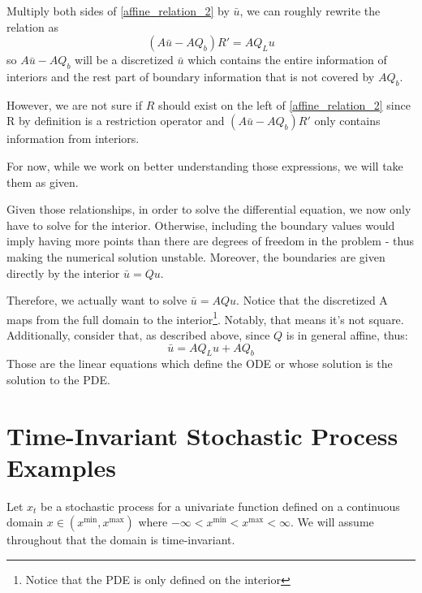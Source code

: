 \documentclass[11pt]{article}
\begin{document}
\begin{itemize}
			Multiply both sides of \eqref{affine_relation_2} by $\bar{u}$, we can roughly rewrite the relation as
			\begin{equation}
			(A \bar{u}-A  Q_b)  R' = A  Q_L u
			\end{equation}
			so $A \bar{u}-A   Q_b$ will be a discretized $\bar{u}$ which contains the entire information of interiors and the rest part of boundary information that is not covered by $A  Q_b$.

			However, we are not sure if $R$ should exist on the left of \eqref{affine_relation_2} since R by definition is a restriction operator and $(A  \bar{u}-A  Q_b) R'$ only contains information from interiors.
			\iffalse %
			Also the size of the LHS of \eqref{affine_relation_2} is $M\times \bar{M}$, but the size of the RHS is $\bar{I}\times I$ .
			\fi
			For now, while we work on better understanding those expressions, we will take them as given.


			Given those relationships, in order to solve the differential equation, we now only have to solve for the interior. Otherwise, including the boundary values would imply having more points than there are degrees of freedom in the problem - thus making the numerical solution unstable. Moreover, the boundaries are given directly by the interior $\bar{u} = Q u$.

			Therefore, we actually want to solve $\bar{u} = A Q u$. Notice that the discretized A maps from the full domain to the interior\footnote{Notice that the PDE is only defined on the interior}. Notably, that means it's not square. Additionally, consider that, as described above, since $Q$ is in general affine, thus:
			\begin{equation}
			\bar{u} = A Q_L u + A Q_b
			\end{equation}
			Those are the linear equations which define the ODE or whose solution is the solution to the PDE.
		\end{itemize}


\section{Time-Invariant Stochastic Process Examples}\label{sec:examples}
Let $x_t$ be a stochastic process for a univariate function defined on a continuous domain $x \in (x^{\min}, x^{\max})$ where $-\infty < x^{\min} < x^{\max} < \infty$.  We will assume throughout that the domain is time-invariant.
\end{document}
